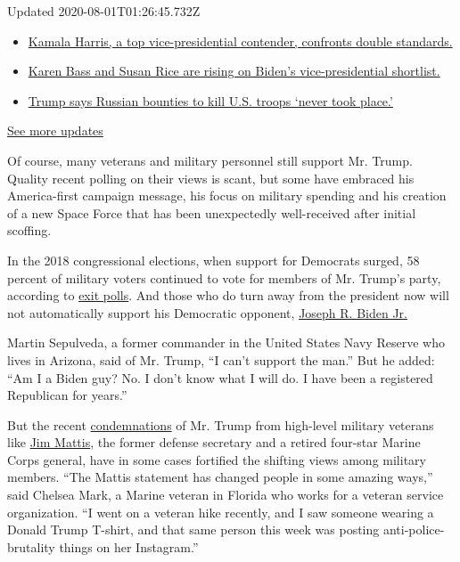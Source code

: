 Updated 2020-08-01T01:26:45.732Z

\begin{itemize}
\tightlist
\item
  \href{https://www.nytimes.com/2020/07/31/us/elections/biden-vs-trump.html?action=click\&pgtype=Article\&state=default\&region=MAIN_CONTENT_1\&context=storylines_live_updates\#link-29fdff45}{Kamala
  Harris, a top vice-presidential contender, confronts double
  standards.}
\item
  \href{https://www.nytimes.com/2020/07/31/us/elections/biden-vs-trump.html?action=click\&pgtype=Article\&state=default\&region=MAIN_CONTENT_1\&context=storylines_live_updates\#link-13ec3d9c}{Karen
  Bass and Susan Rice are rising on Biden's vice-presidential
  shortlist.}
\item
  \href{https://www.nytimes.com/2020/07/31/us/elections/biden-vs-trump.html?action=click\&pgtype=Article\&state=default\&region=MAIN_CONTENT_1\&context=storylines_live_updates\#link-49e9a016}{Trump
  says Russian bounties to kill U.S. troops `never took place.'}
\end{itemize}

\href{https://www.nytimes.com/2020/07/31/us/elections/biden-vs-trump.html?action=click\&pgtype=Article\&state=default\&region=MAIN_CONTENT_1\&context=storylines_live_updates}{See
more updates}

Of course, many veterans and military personnel still support Mr. Trump.
Quality recent polling on their views is scant, but some have embraced
his America-first campaign message, his focus on military spending and
his creation of a new Space Force that has been unexpectedly
well-received after initial scoffing.

In the 2018 congressional elections, when support for Democrats surged,
58 percent of military voters continued to vote for members of Mr.
Trump's party, according to
\href{https://www.cnn.com/election/2018/exit-polls}{exit polls}. And
those who do turn away from the president now will not automatically
support his Democratic opponent,
\href{https://www.nytimes.com/interactive/2020/us/elections/joe-biden.html}{Joseph
R. Biden Jr.}

Martin Sepulveda, a former commander in the United States Navy Reserve
who lives in Arizona, said of Mr. Trump, ``I can't support the man.''
But he added: ``Am I a Biden guy? No. I don't know what I will do. I
have been a registered Republican for years.''

But the recent
\href{https://www.nytimes.com/2020/06/03/us/politics/jim-mattis-trump-protests.html}{condemnations}
of Mr. Trump from high-level military veterans like
\href{https://www.nytimes.com/2020/06/04/us/politics/murkowski-mattis-trump.html}{Jim
Mattis}, the former defense secretary and a retired four-star Marine
Corps general, have in some cases fortified the shifting views among
military members. ``The Mattis statement has changed people in some
amazing ways,'' said Chelsea Mark, a Marine veteran in Florida who works
for a veteran service organization. ``I went on a veteran hike recently,
and I saw someone wearing a Donald Trump T-shirt, and that same person
this week was posting anti-police-brutality things on her Instagram.''

